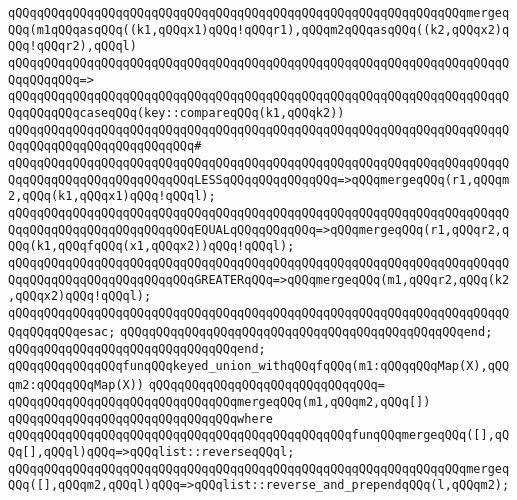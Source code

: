 \newline
\verb|qQQqqQQqqQQqqQQqqQQqqQQqqQQqqQQqqQQqqQQqqQQqqQQqqQQqqQQqqQQqqQQqmergeqQQq(m1qQQqasqQQq((k1,qQQqx1)qQQq!qQQqr1),qQQqm2qQQqasqQQq((k2,qQQqx2)qQQq!qQQqr2),qQQql)|\newline
\verb|qQQqqQQqqQQqqQQqqQQqqQQqqQQqqQQqqQQqqQQqqQQqqQQqqQQqqQQqqQQqqQQqqQQqqQQqqQQqqQQq=>|\newline
\verb|qQQqqQQqqQQqqQQqqQQqqQQqqQQqqQQqqQQqqQQqqQQqqQQqqQQqqQQqqQQqqQQqqQQqqQQqqQQqqQQqcaseqQQq(key::compareqQQq(k1,qQQqk2))|\newline
\verb|qQQqqQQqqQQqqQQqqQQqqQQqqQQqqQQqqQQqqQQqqQQqqQQqqQQqqQQqqQQqqQQqqQQqqQQqqQQqqQQqqQQqqQQqqQQqqQQq#|\newline
\verb|qQQqqQQqqQQqqQQqqQQqqQQqqQQqqQQqqQQqqQQqqQQqqQQqqQQqqQQqqQQqqQQqqQQqqQQqqQQqqQQqqQQqqQQqqQQqqQQqLESSqQQqqQQqqQQqqQQq=>qQQqmergeqQQq(r1,qQQqm2,qQQq(k1,qQQqx1)qQQq!qQQql);|\newline
\verb|qQQqqQQqqQQqqQQqqQQqqQQqqQQqqQQqqQQqqQQqqQQqqQQqqQQqqQQqqQQqqQQqqQQqqQQqqQQqqQQqqQQqqQQqqQQqqQQqEQUALqQQqqQQqqQQq=>qQQqmergeqQQq(r1,qQQqr2,qQQq(k1,qQQqfqQQq(x1,qQQqx2))qQQq!qQQql);|\newline
\verb|qQQqqQQqqQQqqQQqqQQqqQQqqQQqqQQqqQQqqQQqqQQqqQQqqQQqqQQqqQQqqQQqqQQqqQQqqQQqqQQqqQQqqQQqqQQqqQQqGREATERqQQq=>qQQqmergeqQQq(m1,qQQqr2,qQQq(k2,qQQqx2)qQQq!qQQql);|\newline
\verb|qQQqqQQqqQQqqQQqqQQqqQQqqQQqqQQqqQQqqQQqqQQqqQQqqQQqqQQqqQQqqQQqqQQqqQQqqQQqqQQqesac;|\newline
\verb|qQQqqQQqqQQqqQQqqQQqqQQqqQQqqQQqqQQqqQQqqQQqqQQqend;|\newline
\verb|qQQqqQQqqQQqqQQqqQQqqQQqqQQqqQQqend;|\newline
\newline
\newline
\verb|qQQqqQQqqQQqqQQqfunqQQqkeyed_union_withqQQqfqQQq(m1:qQQqqQQqMap(X),qQQqm2:qQQqqQQqMap(X))|\newline
\verb|qQQqqQQqqQQqqQQqqQQqqQQqqQQqqQQq=|\newline
\verb|qQQqqQQqqQQqqQQqqQQqqQQqqQQqqQQqmergeqQQq(m1,qQQqm2,qQQq[])|\newline
\verb|qQQqqQQqqQQqqQQqqQQqqQQqqQQqqQQqwhere|\newline
\verb|qQQqqQQqqQQqqQQqqQQqqQQqqQQqqQQqqQQqqQQqqQQqqQQqfunqQQqmergeqQQq([],qQQq[],qQQql)qQQq=>qQQqlist::reverseqQQql;|\newline
\verb|qQQqqQQqqQQqqQQqqQQqqQQqqQQqqQQqqQQqqQQqqQQqqQQqqQQqqQQqqQQqqQQqmergeqQQq([],qQQqm2,qQQql)qQQq=>qQQqlist::reverse_and_prependqQQq(l,qQQqm2);|\newline
